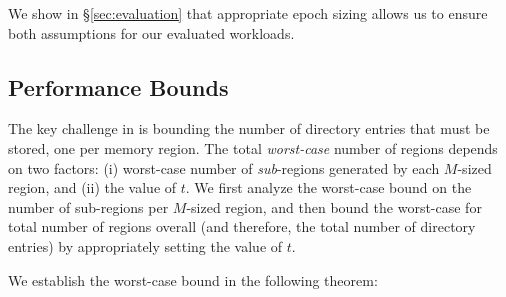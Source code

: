 \noindent
We show in \S\ref{sec:evaluation} that appropriate epoch sizing allows us to ensure both assumptions for our evaluated workloads.

\subsection{Performance Bounds}
\label{ssec:bound}
The key challenge in \algo is bounding the number of directory entries that must be stored, one per memory region. The total \textit{worst-case} number of regions depends on two factors: (i) worst-case number of \textit{sub}-regions generated by each $M$-sized region, and (ii) the value of $t$. We first analyze the worst-case bound on the number of sub-regions per $M$-sized region, and then bound the worst-case for total number of regions overall (and therefore, the total number of directory entries) by appropriately setting the value of $t$.


 We establish the worst-case bound in the following theorem:

